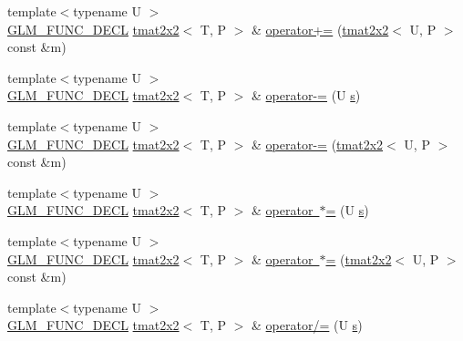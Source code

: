 \begin{DoxyCompactItemize}
\item 
{\footnotesize template$<$typename U $>$ }\\\mbox{\hyperlink{setup_8hpp_ab2d052de21a70539923e9bcbf6e83a51}{G\+L\+M\+\_\+\+F\+U\+N\+C\+\_\+\+D\+E\+CL}} \mbox{\hyperlink{structglm_1_1tmat2x2}{tmat2x2}}$<$ T, P $>$ \& \mbox{\hyperlink{structglm_1_1tmat2x2_a2d82c9fdd02307411612b97393275f38}{operator+=}} (\mbox{\hyperlink{structglm_1_1tmat2x2}{tmat2x2}}$<$ U, P $>$ const \&m)
\item 
{\footnotesize template$<$typename U $>$ }\\\mbox{\hyperlink{setup_8hpp_ab2d052de21a70539923e9bcbf6e83a51}{G\+L\+M\+\_\+\+F\+U\+N\+C\+\_\+\+D\+E\+CL}} \mbox{\hyperlink{structglm_1_1tmat2x2}{tmat2x2}}$<$ T, P $>$ \& \mbox{\hyperlink{structglm_1_1tmat2x2_aac5fa22c39a4a420d9639ca5702771e4}{operator-\/=}} (U \mbox{\hyperlink{glad_8h_af1b1d5edfea6a34daee7389b1b5810ad}{s}})
\item 
{\footnotesize template$<$typename U $>$ }\\\mbox{\hyperlink{setup_8hpp_ab2d052de21a70539923e9bcbf6e83a51}{G\+L\+M\+\_\+\+F\+U\+N\+C\+\_\+\+D\+E\+CL}} \mbox{\hyperlink{structglm_1_1tmat2x2}{tmat2x2}}$<$ T, P $>$ \& \mbox{\hyperlink{structglm_1_1tmat2x2_ae7ef21b7c166f1d890d1e3e04b9da637}{operator-\/=}} (\mbox{\hyperlink{structglm_1_1tmat2x2}{tmat2x2}}$<$ U, P $>$ const \&m)
\item 
{\footnotesize template$<$typename U $>$ }\\\mbox{\hyperlink{setup_8hpp_ab2d052de21a70539923e9bcbf6e83a51}{G\+L\+M\+\_\+\+F\+U\+N\+C\+\_\+\+D\+E\+CL}} \mbox{\hyperlink{structglm_1_1tmat2x2}{tmat2x2}}$<$ T, P $>$ \& \mbox{\hyperlink{structglm_1_1tmat2x2_a2cac001e9a02e80ebbba1161963e53c1}{operator $\ast$=}} (U \mbox{\hyperlink{glad_8h_af1b1d5edfea6a34daee7389b1b5810ad}{s}})
\item 
{\footnotesize template$<$typename U $>$ }\\\mbox{\hyperlink{setup_8hpp_ab2d052de21a70539923e9bcbf6e83a51}{G\+L\+M\+\_\+\+F\+U\+N\+C\+\_\+\+D\+E\+CL}} \mbox{\hyperlink{structglm_1_1tmat2x2}{tmat2x2}}$<$ T, P $>$ \& \mbox{\hyperlink{structglm_1_1tmat2x2_a754160992632ad804a8e1e5cdfa99a13}{operator $\ast$=}} (\mbox{\hyperlink{structglm_1_1tmat2x2}{tmat2x2}}$<$ U, P $>$ const \&m)
\item 
{\footnotesize template$<$typename U $>$ }\\\mbox{\hyperlink{setup_8hpp_ab2d052de21a70539923e9bcbf6e83a51}{G\+L\+M\+\_\+\+F\+U\+N\+C\+\_\+\+D\+E\+CL}} \mbox{\hyperlink{structglm_1_1tmat2x2}{tmat2x2}}$<$ T, P $>$ \& \mbox{\hyperlink{structglm_1_1tmat2x2_a9004d0d6f8a7e19c0d592a0f1f9aed65}{operator/=}} (U \mbox{\hyperlink{glad_8h_af1b1d5edfea6a34daee7389b1b5810ad}{s}})

\end{DoxyCompactItemize}
